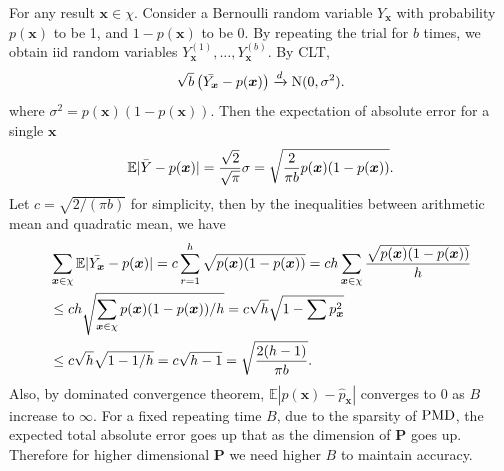 \documentclass[12pt]{article}
\newcommand{\EE}{\mathbb{E}}
\newcommand{\Pmat}{\mathbf{P}}
\newcommand{\PMD}{{\normalfont\textrm{PMD}}}
\newcommand{\wh}{\widehat}
\newcommand{\xvec}{\boldsymbol{x}}
\begin{document}
For any result $\xvec \in \chi$. Consider a Bernoulli random variable $Y_{\xvec}$ with probability $p(\xvec)$ to be 1, and $1-p(\xvec)$ to be 0. By repeating the trial for $b$ times, we obtain iid random variables $Y_{\xvec}^{(1)},\dots,Y_{\xvec}^{(b)}$. By CLT,
\begin{equation*}
    \sqrt{b} \left(\Bar{Y_{\xvec}}-p(\xvec) \right)\xrightarrow{d} \textrm{N}(0,\sigma^2).
\end{equation*}
where $\sigma^2 = p(\xvec)(1-p(\xvec))$. Then the expectation of absolute error for a single $\xvec$
\begin{equation*}
    \EE |\Bar{Y}-p(\xvec)| = \frac{\sqrt{2}}{\sqrt{\pi}}\sigma = \sqrt{\frac{2}{\pi b}p(\xvec)(1-p(\xvec))}.
\end{equation*}
Let $c = \sqrt{2/(\pi b)}$ for simplicity, then by the inequalities between arithmetic mean and quadratic mean, we have
\begin{align*}
    & \sum_{\xvec \in \chi}\EE |\Bar{Y_{\xvec}}-p(\xvec)| = c \sum_{r=1}^{h} \sqrt{p(\xvec)(1-p(\xvec))}  = c h \sum_{\xvec\in\chi}\frac{\sqrt{p(\xvec)(1-p(\xvec))}}{h} \\
    & \leq c h \sqrt{\sum_{\xvec \in \chi}p(\xvec)(1-p(\xvec))/h} = c \sqrt{h} \sqrt{1-\sum p_{\xvec}^2} \\ &\leq c \sqrt{h} \sqrt{1-1/h} = c\sqrt{h-1} = \sqrt{\frac{2(h-1)}{\pi b}}.
\end{align*}
Also, by dominated convergence theorem, 
$\EE|p(\xvec) - \wh{p}_{\xvec}|$ converges to 0 as $B$ increase to $\infty$.
For a fixed repeating time $B$, due to the sparsity of $\PMD$, the expected total absolute error goes up that as the dimension of $\Pmat$ goes up. Therefore for higher dimensional $\Pmat$ we need higher $B$ to maintain accuracy.

\end{document}
